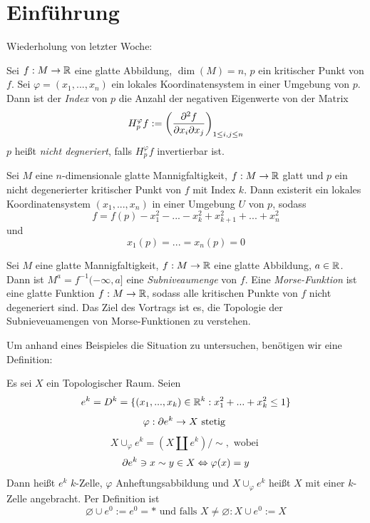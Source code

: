 \section{Einführung}

Wiederholung von letzter Woche:

\begin{definition}
    Sei $f: M \to \R$ eine glatte Abbildung, $\dim(M) = n$, $p$ ein kritischer 
    Punkt von $f$. Sei $\varphi = (x_1, ..., x_n)$ ein lokales Koordinatensystem 
    in einer Umgebung von $p$. Dann ist der \textit{Index} von $p$ die Anzahl 
    der negativen Eigenwerte von der Matrix
    \[ H_p^{\varphi}f := \left( \pdderive[f]{x_i}{x_j} \right)_{1 \leq i, j \leq n} \]
    $p$ heißt \textit{nicht degneriert}, falls  $H_p^{\varphi}f$ invertierbar ist.
\end{definition}

\begin{theorem}
    Sei $M$ eine $n$-dimensionale glatte Mannigfaltigkeit, $f: M \to \R$ glatt 
    und $p$ ein nicht degenerierter kritischer Punkt von $f$ mit Index $k$. Dann 
    existerit ein lokales Koordinatensystem $(x_1, ..., x_n)$ in einer Umgebung
    $U$ von $p$, sodass
    \[ f = f(p) - x_1^2 - ... - x_k^2 + x_{k + 1}^2 + ... + x_n^2 \]
    und 
    \[ x_1(p) = ... = x_n (p) = 0 \]
\end{theorem}
\sectiondone

Sei $M$ eine glatte Mannigfaltigkeit, $f: M \to \R$ eine glatte Abbildung, 
$a \in \R$. Dann ist $M^a = f^{-1}(- \infty, a]$ eine \textit{Subniveaumenge} 
von $f$. Eine \textit{Morse-Funktion} ist eine glatte Funktion $f: M \to \R$, 
sodass alle kritischen Punkte von $f$ nicht degeneriert sind.
Das Ziel des Vortrags ist es, die Topologie der Subnieveuamengen von 
Morse-Funktionen zu verstehen. 

Um anhand eines Beispieles die Situation zu untersuchen, benötigen wir eine 
Definition:

\begin{definition}
    Es sei $X$ ein Topologischer Raum. Seien
    \[ e^k = D^k = \{(x_1, ..., x_k) \in \R^k: x_1^2 + ... + x_k^2 \leq 1\} \]
    \[ \varphi: \del e^k \rightarrow X \text{ stetig } \]
    \[ X \cup_{\varphi} e^k = (X \amalg e^k) / \sim, \text{ wobei } \]
    \[ \del e^k \ni x \sim y \in X \Leftrightarrow \varphi(x) = y \]
    Dann heißt $e^k$ $k$-Zelle, $\varphi$ Anheftungsabbildung 
    und $X \cup_{\varphi} e^k$ heißt $X$ mit einer $k$-Zelle 
    angebracht.
    Per Definition ist 
    \[ \varnothing \cup e^0 := e^0 = \ast \text{ und falls } X \neq \varnothing : X \cup e^0 := X \]
\end{definition}

